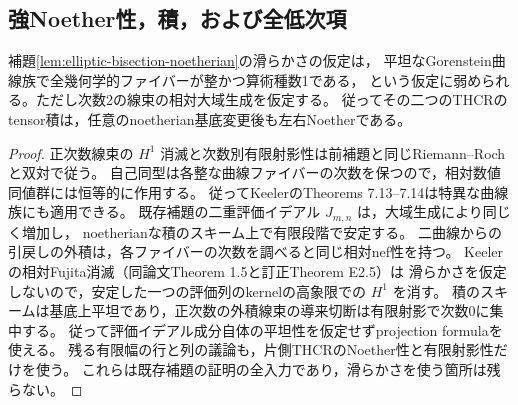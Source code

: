 \subsection{強Noether性，積，および全低次項}

\begin{lemma}\label{lem:integral-genus-one-bisection}
補題\ref{lem:elliptic-bisection-noetherian}の滑らかさの仮定は，
平坦なGorenstein曲線族で全幾何学的ファイバーが整かつ算術種数1である，
という仮定に弱められる。ただし次数2の線束の相対大域生成を仮定する。
従ってその二つのTHCRのtensor積は，任意のnoetherian基底変更後も左右Noetherである。
\end{lemma}
\begin{proof}
正次数線束の $H^1$ 消滅と次数別有限射影性は前補題と同じRiemann--Rochと双対で従う。
自己同型は各整な曲線ファイバーの次数を保つので，相対数値同値群には恒等的に作用する。
従ってKeelerのTheorems 7.13--7.14\cite{Keeler2003}は特異な曲線族にも適用できる。
既存補題の二重評価イデアル $J_{m,n}$ は，大域生成により同じく増加し，
noetherianな積のスキーム上で有限段階で安定する。
二曲線からの引戻しの外積は，各ファイバーの次数を調べると同じ相対nef性を持つ。
Keelerの相対Fujita消滅（同論文Theorem 1.5と訂正Theorem E2.5）は
滑らかさを仮定しないので，安定した一つの評価列のkernelの高象限での $H^1$ を消す。
積のスキームは基底上平坦であり，正次数の外積線束の導来切断は有限射影で次数0に集中する。
従って評価イデアル成分自体の平坦性を仮定せずprojection formulaを使える。
残る有限幅の行と列の議論も，片側THCRのNoether性と有限射影性だけを使う。
これらは既存補題の証明の全入力であり，滑らかさを使う箇所は残らない。
\end{proof}

